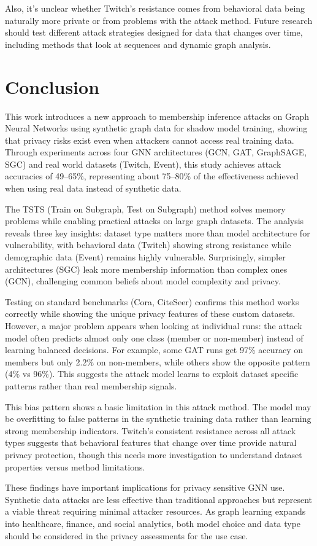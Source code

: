 \documentclass{article}
\begin{document}
Also, it's unclear whether Twitch's resistance comes from behavioral data being naturally more private or from problems with the attack method. Future research should test different attack strategies designed for data that changes over time, including methods that look at sequences and dynamic graph analysis.

\section{Conclusion}
This work introduces a new approach to membership inference attacks on Graph Neural Networks using synthetic graph data for shadow model training, showing that privacy risks exist even when attackers cannot access real training data. Through experiments across four GNN architectures (GCN, GAT, GraphSAGE, SGC) and real world datasets (Twitch, Event), this study achieves attack accuracies of 49--65\%, representing about 75--80\% of the effectiveness achieved when using real data instead of synthetic data.

The TSTS (Train on Subgraph, Test on Subgraph) method solves memory problems while enabling practical attacks on large graph datasets. The analysis reveals three key insights: dataset type matters more than model architecture for vulnerability, with behavioral data (Twitch) showing strong resistance while demographic data (Event) remains highly vulnerable. Surprisingly, simpler architectures (SGC) leak more membership information than complex ones (GCN), challenging common beliefs about model complexity and privacy.

Testing on standard benchmarks (Cora, CiteSeer) confirms this method works correctly while showing the unique privacy features of these custom datasets. However, a major problem appears when looking at individual runs: the attack model often predicts almost only one class (member or non-member) instead of learning balanced decisions. For example, some GAT runs get 97\% accuracy on members but only 2.2\% on non-members, while others show the opposite pattern (4\% vs 96\%). This suggests the attack model learns to exploit dataset specific patterns rather than real membership signals.

This bias pattern shows a basic limitation in this attack method. The model may be overfitting to false patterns in the synthetic training data rather than learning strong membership indicators. Twitch's consistent resistance across all attack types suggests that behavioral features that change over time provide natural privacy protection, though this needs more investigation to understand dataset properties versus method limitations.

These findings have important implications for privacy sensitive GNN use. Synthetic data attacks are less effective than traditional approaches but represent a viable threat requiring minimal attacker resources. As graph learning expands into healthcare, finance, and social analytics, both model choice and data type should be considered  in the privacy assessments for the use case.




\end{document}
